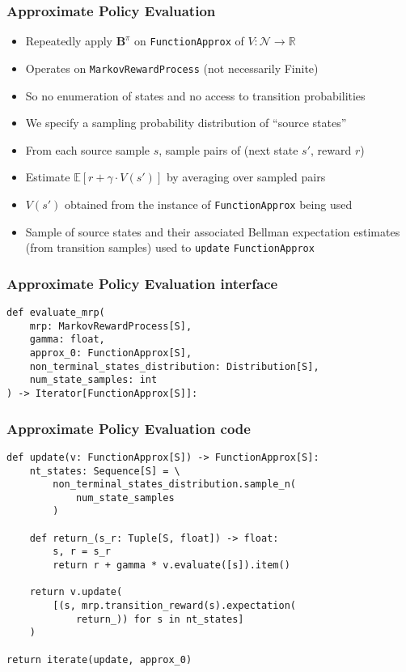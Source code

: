 \documentclass[handout]{beamer}
\begin{document}
\begin{frame}
\frametitle{Approximate Policy Evaluation}
\pause
\begin{itemize}[<+->]
\item Repeatedly apply $\bm{B}^{\pi}$ on \lstinline{FunctionApprox} of $V: \mathcal{N} \rightarrow \mathbb{R}$	
\item Operates on \lstinline{MarkovRewardProcess} (not necessarily Finite)
\item So no enumeration of states and no access to transition probabilities
\item We specify a sampling probability distribution of ``source states''
\item From each source sample $s$, sample pairs of (next state $s'$, reward $r$)
\item Estimate $\mathbb{E}[r + \gamma \cdot V(s')]$ by averaging over sampled pairs
\item  $V(s')$ obtained from the instance of \lstinline{FunctionApprox} being used
\item Sample of source states and their associated Bellman expectation estimates (from transition samples) used to \lstinline{update} \lstinline{FunctionApprox}
\end{itemize}
\end{frame}

\begin{frame}[fragile]
\frametitle{Approximate Policy Evaluation interface}
\pause
\begin{lstlisting}
def evaluate_mrp(
    mrp: MarkovRewardProcess[S],
    gamma: float,
    approx_0: FunctionApprox[S],
    non_terminal_states_distribution: Distribution[S],
    num_state_samples: int
) -> Iterator[FunctionApprox[S]]:
\end{lstlisting}
\end{frame}

\begin{frame}[fragile]
\frametitle{Approximate Policy Evaluation code}
\pause
\begin{lstlisting}
def update(v: FunctionApprox[S]) -> FunctionApprox[S]:
    nt_states: Sequence[S] = \
        non_terminal_states_distribution.sample_n(
            num_state_samples
        )

    def return_(s_r: Tuple[S, float]) -> float:
        s, r = s_r
        return r + gamma * v.evaluate([s]).item()

    return v.update(
        [(s, mrp.transition_reward(s).expectation(
            return_)) for s in nt_states]
    )

return iterate(update, approx_0)
\end{lstlisting}
\end{frame}
\end{document}
